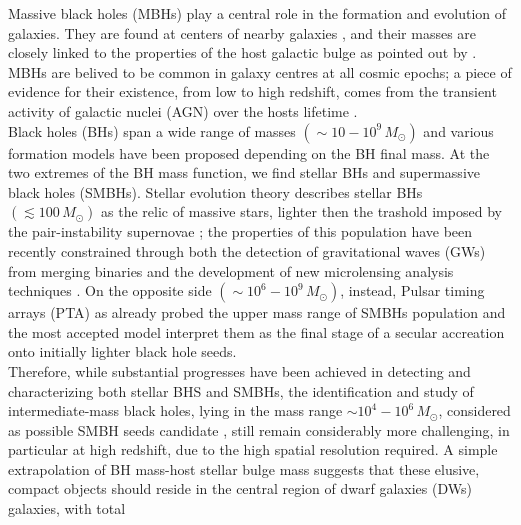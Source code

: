 \documentclass[12pt,twoside,openany]{book}
\begin{document}
Massive black holes (MBHs) play a central role in the formation and evolution of galaxies. They are  found at centers of nearby galaxies \parencite{Kormendy_1995}, and their masses are closely linked to the properties of the host galactic bulge as pointed out by \textcite{Magorrian_1998}. MBHs are belived to be common in galaxy centres at all cosmic epochs; a piece of evidence for their existence, from low to high redshift, comes from the transient activity of galactic nuclei (AGN) over the hosts lifetime \parencite{Jahnke_2025}.\\Black holes (BHs) span a wide range of masses $(\sim 10-10^{9}\,M_\odot)$ and various formation models have been proposed depending on the BH final mass. At the two extremes of the BH mass function, we find stellar BHs and supermassive black holes (SMBHs). Stellar evolution theory describes stellar BHs $(\lesssim 100\,M_\odot)$ as the relic of massive stars, lighter then the trashold imposed by the pair-instability supernovae \parencite{Farmer_2019}; the properties of this population have been recently constrained through both the detection of gravitational waves (GWs) from merging binaries \parencite{Abbott_2016} and the development of new microlensing analysis techniques \parencite{bennett_2002}. On the opposite side $(\sim 10^6-10^9\,M_\odot)$, instead, Pulsar timing arrays (PTA) as already probed the upper mass range of SMBHs population \parencite{Taylor_2021} and the most accepted model interpret them as the final stage of a secular accreation onto initially lighter black hole seeds.\\Therefore, while substantial progresses have been achieved in detecting and characterizing both stellar BHS  and SMBHs, the identification and study of intermediate-mass black holes, lying in the mass range $\sim 10^4-10^6\,M_\odot$, considered as possible SMBH seeds candidate \parencite{Devecchi_2009}, still remain considerably more challenging, in particular at high redshift, due to the high spatial resolution required. A simple extrapolation of BH mass-host stellar bulge mass suggests that these elusive, compact objects should reside in the central region of dwarf galaxies (DWs) galaxies, with total
\end{document}
